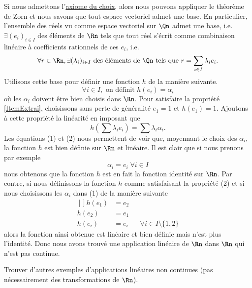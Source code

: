 Si nous admettons l'\href{http://fr.wikipedia.org/wiki/Axiome_du_choix}{axiome du choix}, alors nous pouvons appliquer le théorème de Zorn et nous savons que tout espace vectoriel admet une base. En particulier, l'ensemble des réels vu comme espace vectoriel sur $\Qn$ admet une base, i.e. $\exists (e_i)_{i\in I}$  des éléments de $\Rn$ tels que tout réel s'écrit comme combinaison linéaire à coefficients rationnels  de ces $e_i$, i.e.
\begin{equation}
	\forall r \in \Rn, \exists (\lambda_i)_{i\in I} \text{ des éléments de } \Qn \text{ tels que  } r = \sum_{i\in I} \lambda_i e_i.
\end{equation}
Utilisons cette base pour définir une fonction $h$ de la manière suivante.
\begin{equation}
\forall i \in I, \mbox{ on définit } h(e_i) = \alpha_i
\end{equation}
 où les $\alpha_i$ doivent être bien choisis dans $\Rn$. Pour satisfaire la propriété \ref{ItemExtrai}, choisissons sans perte de généralité $e_1 = 1$ et $h(e_1) = 1$.  Ajoutons à cette propriété la linéarité en imposant que 
\begin{equation}
h(\sum \lambda_i e_i) = \sum \lambda_i \alpha_i.
\end{equation}
Les équations (1) et (2) nous permettent de voir que, moyennant le choix des $\alpha_i$, la fonction $h$ est bien définie sur $\Rn$ et linéaire. Il est clair que si nous prenons par exemple
$$\alpha_i=e_i\;\forall i \in I$$ 
nous obtenons que la fonction $h$ est en fait la fonction identité sur $\Rn$. Par contre, si nous définissons la fonction $h$ comme satisfaisant la propriété (2) et si nous choisissons les $\alpha_i$ dans (1) de la manière suivante 
\begin{equation}
	\begin{aligned}[]
		h(e_1)	&= e_2\\
		h(e_2)	&= e_1\\
		h(e_i)	&= e_i	&&\forall i\in I\setminus\{ 1,2 \}
	\end{aligned}
\end{equation}
alors la fonction ainsi obtenue est  linéaire et bien définie mais n'est plus l'identité. Donc nous avons trouvé une application linéaire de $\Rn$ dans $\Rn$ qui n'est pas continue.  

\begin{exercice}
 Trouver d'autres exemples d'applications linéaires non continues (pas nécessairement des transformations de $\Rn$). 		
\end{exercice}
